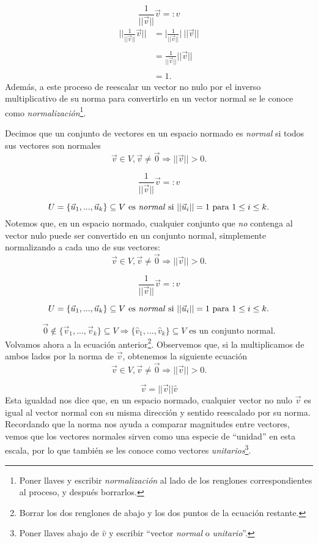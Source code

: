 \documentclass[12pt,dvipsnames]{article}
\numberwithin{equation}{section}
\begin{document}
\[
\frac{1}{||\vec{v}||} \vec{v} =: \hat{v}
\] 
\begin{align*}
                \bigg|\bigg|\frac{1}{||\vec{v}||} \vec{v} \bigg|\bigg| &= \bigg| \frac{1}{||\vec{v}||} \bigg| \ ||\vec{v}|| \\ \\
                                                                       &= \frac{1}{||\vec{v}||} ||\vec{v}|| \\ \\
                                                                       &=1.
\end{align*}
Además, a este proceso de reescalar un vector no nulo por el inverso multiplicativo de su norma para convertirlo en un vector normal se le conoce como \emph{normalización}\footnote{Poner llaves y escribir \emph{normalización} al lado de los renglones correspondientes al proceso, y después borrarlos.}.

Decimos que un conjunto de vectores en un espacio normado es \emph{normal} si todos sus vectores son normales
\[
    \vec{v}\in V, \vec{v}\neq \vec{0} \Rightarrow ||\vec{v}||>0.
\] 

\[
    \frac{1}{||\vec{v}||} \vec{v} =: \hat{v}
\] 

\[
    U=\{\vec{u}_1,...,\vec{u}_k\}\subseteq V \ \text{es \emph{normal} si } ||\vec{u}_i|| = 1 \text{ para } 1\le i\le k.
\]
Notemos que, en un espacio normado, cualquier conjunto que \emph{no} contenga al vector nulo puede ser convertido en un conjunto normal, simplemente normalizando a cada uno de sus vectores:
\[
    \vec{v}\in V, \vec{v}\neq \vec{0} \Rightarrow ||\vec{v}||>0.
\] 

\[
    \frac{1}{||\vec{v}||} \vec{v} =: \hat{v}
\] 

\[
    U=\{\vec{u}_1,...,\vec{u}_k\}\subseteq V \ \text{es \emph{normal} si } ||\vec{u}_i|| = 1 \text{ para } 1\le i\le k.
\]

\[
\vec{0}\notin\{\vec{v}_1,...,\vec{v}_k\}\subseteq V \Rightarrow \{\hat{v}_1, ..., \hat{v}_k\}\subseteq V \text{ es un conjunto normal}.
\] 
Volvamos ahora a la ecuación anterior\footnote{Borrar los dos renglones de abajo y los dos puntos de la ecuación restante.}. Observemos que, si la multiplicamos de ambos lados por la norma de $\vec{v}$, obtenemos la siguiente ecuación
\[
    \vec{v}\in V, \vec{v}\neq \vec{0} \Rightarrow ||\vec{v}||>0.
\] 

\[
    \vec{v}= ||\vec{v}|| \hat{v}
\] 
Esta igualdad nos dice que, en un espacio normado, cualquier vector no nulo $\vec{v}$ es igual al vector normal con su misma dirección y sentido reescalado por su norma. Recordando que la norma nos ayuda a comparar magnitudes entre vectores, vemos que los vectores normales sirven como una especie de ``unidad'' en esta escala, por lo que también se les conoce como vectores \emph{unitarios}\footnote{Poner llaves abajo de $\hat{v}$ y escribir ``vector \emph{normal} o \emph{unitario}''.}. 
\end{document}
